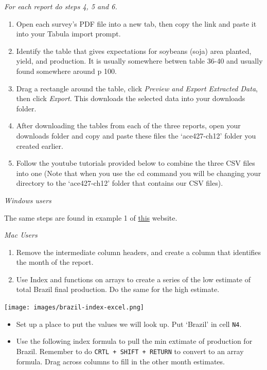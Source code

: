 \documentclass[
]{book}
\begin{document}
\emph{For each report do steps 4, 5 and 6.}

\begin{enumerate}
\def\labelenumi{\arabic{enumi}.}
\setcounter{enumi}{3}
\item
  Open each survey's PDF file into a new tab, then copy the link and paste it into your Tabula import prompt.
\item
  Identify the table that gives expectations for soybeans (soja) area planted, yield, and production. It is usually somewhere betwen table 36-40 and usually found somewhere around p 100.
\item
  Drag a rectangle around the table, click \emph{Preview and Export Extracted Data}, then click \emph{Export}. This downloads the selected data into your downloads folder.
\item
  After downloading the tables from each of the three reports, open your downloads folder and copy and paste these files the `ace427-ch12' folder you created earlier.
\item
  Follow the youtube tutorials provided below to combine the three CSV files into one (Note that when you use the cd command you will be changing your directory to the `ace427-ch12' folder that contains our CSV files).
\end{enumerate}

\emph{Windows users}

The same steps are found in example 1 of \href{https://www.rondebruin.nl/win/s3/win021.htm}{this} website.

\emph{Mac Users}

\begin{enumerate}
\def\labelenumi{\arabic{enumi}.}
\setcounter{enumi}{8}
\item
  Remove the intermediate column headers, and create a column that identifies the month of the report.
\item
  Use Index and functions on arrays to create a series of the low estimate of total Brazil final production. Do the same for the high estimate.
\end{enumerate}

\texttt{[image: images/brazil-index-excel.png]}

\begin{itemize}
\item
  Set up a place to put the values we will look up. Put `Brazil' in cell \texttt{N4}.
\item
  Use the following index formula to pull the min extimate of production for Brazil. Remember to do \texttt{CRTL\ +\ SHIFT\ +\ RETURN} to convert to an array formula. Drag across columns to fill in the other month estimates.
\end{itemize}
\end{document}
